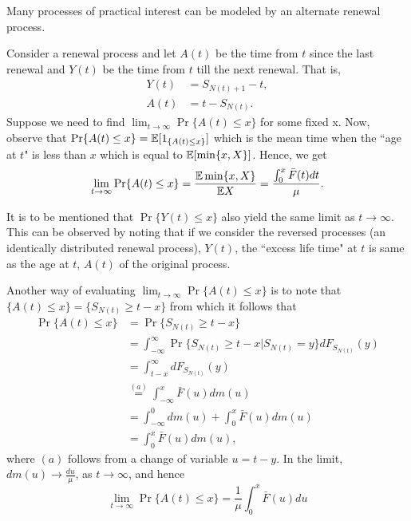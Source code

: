 \documentclass[a4paper,10pt,english]{article}
\begin{document}
Many processes of practical interest can be modeled by an alternate renewal process. 
\begin{exmp} Consider a renewal process and let $A(t)$ be the time from $t$ since the last renewal and $Y(t)$ be the time from $t$ till the next renewal. That is,
\begin{align*}
Y(t) &=S_{N(t)+1}-t,\\
A(t) &=t-S_{N(t)}.
\end{align*}   
Suppose we need to find $\lim_{t \to \infty}\Pr\{A(t) \leq x\}$ for some fixed  x. Now, observe that $\Pr\{A(t) \leq x\}=\mathbb{E}[1_{\{A(t) \leq x\}}]$ which is the mean time when the ``age at $t$" is less than $x$ which is equal to $\mathbb{E}[\min\{x,X\}]$. Hence, we get\\
\begin{equation*}
\lim_{t \rightarrow \infty} \Pr\{A(t) \leq x\} =\frac{\mathbb{E} \min\{x,X\}}{\mathbb{E} X} = \frac{\int_{0}^{x}\bar{F}(t)dt}{\mu}.
\end{equation*}  
\end{exmp}
It is to be mentioned that $\Pr\{Y(t)\leq x\}$ also yield the same limit as $t \to \infty$. This can be observed by noting that if we consider the reversed processes (an identically distributed renewal process), $Y(t)$,  the ``excess life time" at $t$ is same as the age at $t$, $A(t)$ of the original process.

Another way of evaluating $\lim_{t\to \infty} \Pr\{A(t)\leq x\}$ is to note that $\{A(t)\leq x\} = \{S_{N(t)}\geq t-x\}$ from which it follows that
\begin{align*}
\Pr\{A(t)\leq x\} &= \Pr\{S_{N(t)}\geq t-x\} \\
& = \int_{-\infty}^{\infty} \Pr\{S_{N(t)} \geq t-x | S_{N(t)}=y\}dF_{S_{N(t)}}(y) \\
& = \int_{t-x}^\infty dF_{S_{N(t)}}(y)\\
&\stackrel{(a)}{=} \int_{-\infty}^x \bar F(u)dm(u)\\
&= \int_{-\infty}^0 dm(u) + \int_{0}^x \bar{F}(u)dm(u)\\
& = \int_{0}^x \bar{F}(u)dm(u),
\end{align*}
where $(a)$ follows from a change of variable $u = t-y$. In the limit, $dm(u) \to \frac{du}{\mu}$, as $t \to \infty$, and hence 
\begin{equation}
\lim_{t\to \infty} \Pr\{A(t)\leq x\} = \frac{1}{\mu}\int_{0}^x \bar{F}(u)du
\end{equation}
\end{document}
